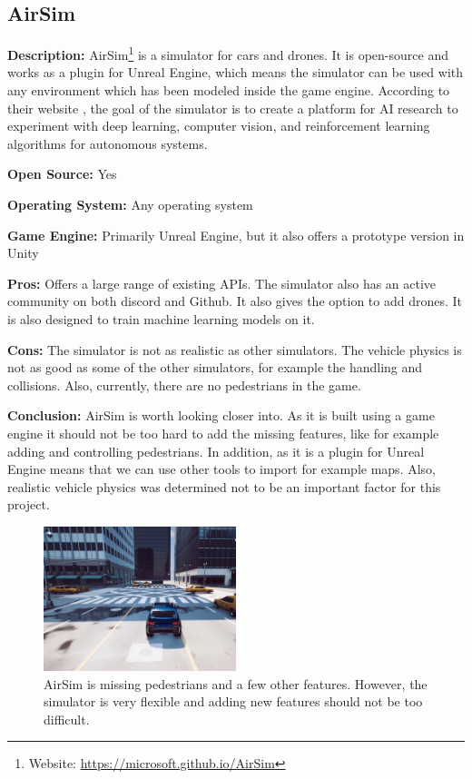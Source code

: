 \subsection{AirSim} \label{AirSimDoc}
\textbf{Description:} AirSim\footnote{Website: \url{https://microsoft.github.io/AirSim}} is a simulator for cars and drones. It is open-source and works as a plugin for Unreal Engine, which means the simulator can be used with any environment which has been modeled inside the game engine. According to their website \cite{AirSim_Website}, the goal of the simulator is to create a platform for AI research to experiment with deep learning, computer vision, and reinforcement learning algorithms for autonomous systems. 

\textbf{Open Source:} Yes

\textbf{Operating System:} Any operating system

\textbf{Game Engine:} Primarily Unreal Engine, but it also offers a prototype version in Unity

\textbf{Pros:} Offers a large range of existing APIs. The simulator also has an active community on both discord and Github. It also gives the option to add drones. It is also designed to train machine learning models on it.

\textbf{Cons:} The simulator is not as realistic as other simulators. The vehicle physics is not as good as some of the other simulators, for example the handling and collisions. Also, currently, there are no pedestrians in the game. 

\textbf{Conclusion:} AirSim is worth looking closer into. As it is built using a game engine it should not be too hard to add the missing features, like for example adding and controlling pedestrians. In addition, as it is a plugin for Unreal Engine means that we can use other tools to import for example maps. Also, realistic vehicle physics was determined not to be an important factor for this project. 

\begin{figure}[H]
    \centering
    \includegraphics[width=0.5\textwidth]{03_Background/Appendix/Simulators/AirSim.JPG}
    \caption{AirSim is missing pedestrians and a few other features. However, the simulator is very flexible and adding new features should not be too difficult.}
\end{figure}

